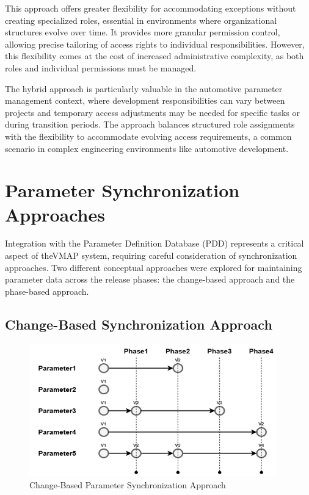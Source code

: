 This approach offers greater flexibility for accommodating exceptions without creating specialized roles, essential in environments where organizational structures evolve over time. It provides more granular permission control, allowing precise tailoring of access rights to individual responsibilities. However, this flexibility comes at the cost of increased administrative complexity, as both roles and individual permissions must be managed.

The hybrid approach is particularly valuable in the automotive parameter management context, where development responsibilities can vary between projects and temporary access adjustments may be needed for specific tasks or during transition periods. The approach balances structured role assignments with the flexibility to accommodate evolving access requirements, a common scenario in complex engineering environments like automotive development.

\section{Parameter Synchronization Approaches}
\label{sec:parameter-sync-approaches}

Integration with the Parameter Definition Database (PDD) represents a critical aspect of the\ac{VMAP} system, requiring careful consideration of synchronization approaches. Two different conceptual approaches were explored for maintaining parameter data across the release phases: the change-based approach and the phase-based approach.

\subsection{Change-Based Synchronization Approach}
\label{subsec:change-based-sync}

\begin{figure}[h]
    \centering
    \includegraphics[width=0.95\textwidth]{figures/change_based_approach.png}
    \caption{Change-Based Parameter Synchronization Approach}
    \label{fig:change-based-sync}
\end{figure}


